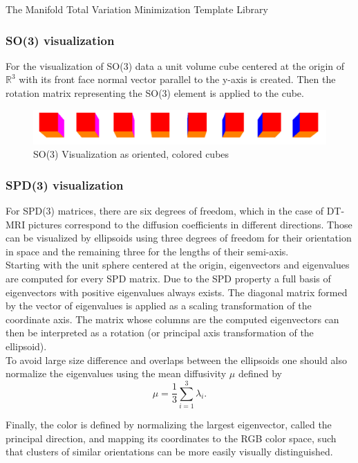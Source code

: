 \begin{chapter}{The Manifold Total Variation Minimization Template Library}
\subsubsection{SO(3) visualization} %
\label{ssub:SO(3) Visualization}
For the visualization of SO(3) data a unit volume cube centered at the origin of $\mathbb{R}^3$ with its front face normal vector parallel to the y-axis is created.
Then the rotation matrix representing the SO(3) element is applied to the cube.

\begin{figure}[h!]
        \centering
	    \includegraphics[width=0.8\linewidth]{./figures/library/cubes.pdf}
	    \caption[SO(3) cube visualization]{SO(3) Visualization as oriented, colored cubes}
	\label{fig:cube_visualization}
\end{figure}

\subsubsection{SPD(3) visualization} %
\label{ssub:SPD(3) Visualization}
For SPD(3) matrices, there are six degrees of freedom, which in the case of DT-MRI pictures correspond to the diffusion coefficients in different directions.
Those can be visualized by ellipsoids using three degrees of freedom for their orientation in space and the remaining three for the lengths of their semi-axis.\\
Starting with the unit sphere centered at the origin, eigenvectors and eigenvalues are computed for every SPD matrix. Due to the SPD property a full basis of eigenvectors
with positive eigenvalues always exists. The diagonal matrix formed by the vector of eigenvalues is applied as a scaling transformation of the coordinate axis. The matrix
whose columns are the computed eigenvectors can then be interpreted as a rotation (or principal axis transformation of the ellipsoid).\\
To avoid large size difference and overlaps between the ellipsoids one should also normalize the eigenvalues using the mean diffusivity $\mu$ defined by
\begin{equation}
    \mu = \frac{1}{3} \sum_{i=1}^{3}\lambda_i.
\end{equation}

Finally, the color is defined by normalizing the largest eigenvector, called the principal direction, and mapping its coordinates to the RGB color space, such that clusters of
similar orientations can be more easily visually distinguished.


\end{chapter}

